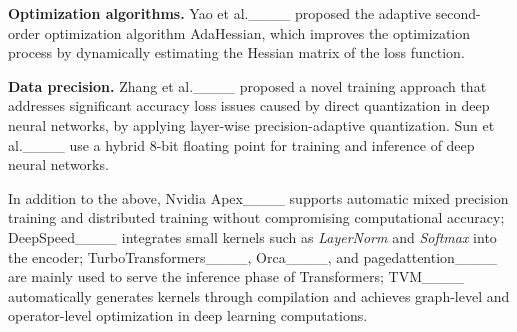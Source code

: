 \noindent\textbf{Optimization algorithms.} Yao et al.____ proposed the adaptive second-order optimization algorithm AdaHessian, which improves the optimization process by dynamically estimating the Hessian matrix of the loss function.

\noindent\textbf{Data precision.} Zhang et al.____ proposed a novel training approach that addresses significant accuracy loss issues caused by direct quantization in deep neural networks, by applying layer-wise precision-adaptive quantization. 
Sun et al.____ use a hybrid 8-bit floating point for training and inference of deep neural networks.

In addition to the above, Nvidia Apex____ supports automatic mixed precision training and distributed training without compromising computational accuracy;
DeepSpeed____ integrates small kernels such as \textit{LayerNorm} and \textit{Softmax} into the encoder; 
TurboTransformers____, Orca____, and pagedattention____ are mainly used to serve the inference phase of Transformers;
TVM____ automatically generates kernels through compilation and achieves graph-level and operator-level optimization in deep learning computations.